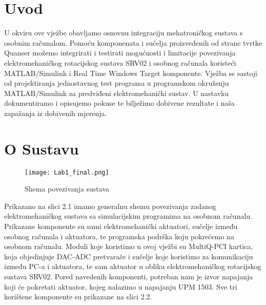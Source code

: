 ﻿  \documentclass[12pt,a4paper]{article}
\begin{document}
\section{Uvod}
U okviru ove vježbe obavljamo osnovnu integraciju mehatroničkog sustava s osobnim računalom. Pomoću komponenata i sučelja proizvedenih od strane tvrtke Quanser možemo integrirati i testirati mogućnosti i limitacije povezivanja elektromehaničkog rotacijskog sustava SRV02 i osobnog računala koristeći MATLAB/Simulink i Real Time Windows Target komponente. Vježba se sastoji od projektiranja jednostavnog test programa u programskom okruženju MATLAB/Simulink za predviđeni elektromehanički sustav. U nastavku dokumentiramo i opisujemo pokuse te bilježimo dobivene rezultate i naša zapažanja iz dobivenih mjerenja.

\newpage

\section{O Sustavu}


\begin{wrapfigure}{L}{0.5\textwidth}
  	\begin{center}
    \texttt{[image: Lab1\_final.png]}
  	\caption{Shema povezivanja sustava}
 	\end{center}
    \vspace{-25pt}
\end{wrapfigure}
Prikazano na slici 2.1 imamo generalnu shemu povezivanja zadanog elektromehaničkog sustava sa simulacijskim programima na osobnom računalu. 
Prikazane komponente su sami elektromehanički aktuatori, sučelje između osobnog računala i aktuatora, te programska podrška koju pokrećemo na osobnom računalu. 
Moduli koje koristimo u ovoj vježbi su MultiQ-PCI kartica, koja objedinjuje DAC-ADC pretvarače i sučelje koje koristimo za komunikaciju između PC-a i aktuatora, te sam aktuator u obliku elektromehaničkog rotacijskog sustava SRV02.
Pored navedenih komponenti, potreban nam je izvor napajanja koji će pokretati aktuator, kojeg nalazimo u napajanju UPM 1503. Sve tri korištene komponente su prikazane na slici 2.2.


\begin{verbatim}







\end{verbatim}
\end{document}
